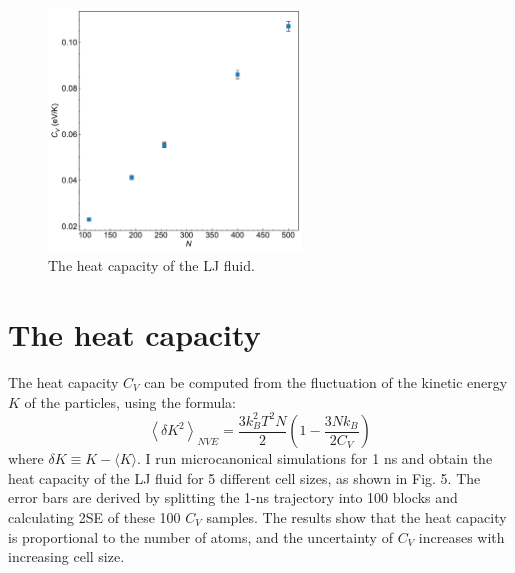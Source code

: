 \documentclass{article}
\newcommand{\ang}[1]{{\langle #1 \rangle}}
\begin{document}
\begin{figure}[!t]
    \centering
    \includegraphics[width=0.6\textwidth]{Cv.pdf}
    \caption{The heat capacity of the LJ fluid.}
\end{figure}

\section{The heat capacity}

The heat capacity $C_V$ can be computed from the fluctuation of the kinetic energy $K$ of the particles, using the formula:
\begin{equation}
    \left \langle \delta K^2 \right \rangle_{N V E} = \frac{3 k_B^2 T^2 N}{2}\left(1-\frac{3 N k_B}{2 C_V}\right)
\end{equation}
where $\delta K \equiv K - \ang{K}$. I run microcanonical simulations for 1 ns and obtain the heat capacity of the LJ fluid for 5 different cell sizes, as shown in Fig. 5. The error bars are derived by splitting the 1-ns trajectory into 100 blocks and calculating 2SE of these 100 $C_V$ samples. The results show that the heat capacity is proportional to the number of atoms, and the uncertainty of $C_V$ increases with increasing cell size.
\end{document}
